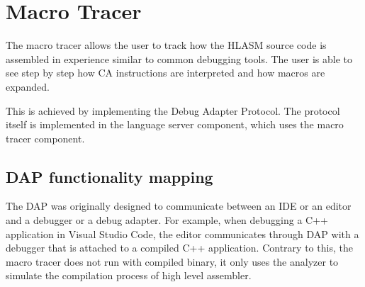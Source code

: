 \chapter{Macro Tracer}
\label{macro_tracer}
The macro tracer allows the user to track how the HLASM source code is assembled in experience similar to common debugging tools. The user is able to see step by step how CA instructions are interpreted and how macros are expanded.

This is achieved by implementing the Debug Adapter Protocol. The protocol itself is implemented in the language server component, which uses the macro tracer component.

\section{DAP functionality mapping}

The DAP was originally designed to communicate between an IDE or an editor and a debugger or a debug adapter. For example, when debugging a C++ application in Visual Studio Code, the editor communicates through DAP with a debugger that is attached to a compiled C++ application. Contrary to this, the macro tracer does not run with compiled binary, it only uses the analyzer to simulate the compilation process of high level assembler.

